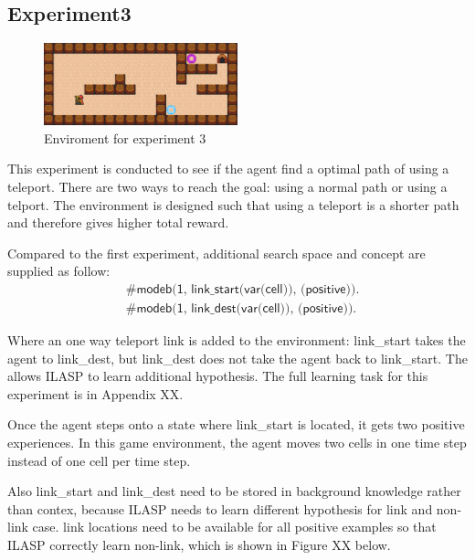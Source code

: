 \subsection{Experiment3}

\begin{figure}[!htb]
\centering
\includegraphics[width=0.5\textwidth]{./figures/experiment3}
\caption{Enviroment for experiment 3}
\label{experiment3}
\end{figure}

This experiment is conducted to see if the agent find a optimal path of using a teleport.
There are two ways to reach the goal: using a normal path or using a telport. 
The environment is designed such that using a teleport is a shorter path and therefore gives higher total reward. 

Compared to the first experiment, additional search space and concept are supplied as follow:
\begin{equation*}
\begin{split}
&\textsf{\#modeb(1, link\_start(var(cell)), (positive)).}\\
&\textsf{\#modeb(1, link\_dest(var(cell)), (positive)).}
\end{split}
\end{equation*}

Where an one way teleport link is added to the environment: link\_start takes the agent to link\_dest, but link\_dest does not take the agent back to link\_start.
The allows ILASP to learn additional hypothesis.
The full learning task for this experiment is in Appendix XX.

Once the agent steps onto a state where link\_start is located, it gets two positive experiences. 
In this game environment, the agent moves two cells in one time step instead of one cell per time step.


Also link\_start and link\_dest need to be stored in background knowledge rather than contex, 
because ILASP needs to learn different hypothesis for link and non-link case. 
link locations need to be available for all positive examples so that ILASP correctly learn non-link, which is shown in Figure XX below.



